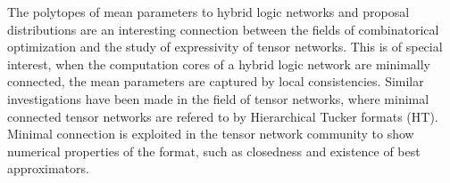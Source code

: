 The polytopes of mean parameters to hybrid logic networks and proposal distributions are an interesting connection between the fields of combinatorical optimization and the study of expressivity of tensor networks.
This is of special interest, when the computation cores of a hybrid logic network are minimally connected, the mean parameters are captured by local consistencies.
Similar investigations have been made in the field of tensor networks, where minimal connected tensor networks are refered to by Hierarchical Tucker formats (HT).
Minimal connection is exploited in the tensor network community to show numerical properties of the format, such as closedness and existence of best approximators.














